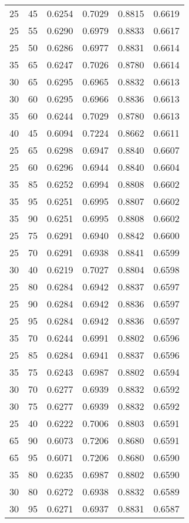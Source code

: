 \begin{center}
\begin{longtable}{|l|l|l|l|l|l|}
25 & 45 & 0.6254 & 0.7029 & 0.8815 & 0.6619 \\
25 & 55 & 0.6290 & 0.6979 & 0.8833 & 0.6617 \\
25 & 50 & 0.6286 & 0.6977 & 0.8831 & 0.6614 \\
35 & 65 & 0.6247 & 0.7026 & 0.8780 & 0.6614 \\
30 & 65 & 0.6295 & 0.6965 & 0.8832 & 0.6613 \\
30 & 60 & 0.6295 & 0.6966 & 0.8836 & 0.6613 \\
35 & 60 & 0.6244 & 0.7029 & 0.8780 & 0.6613 \\
40 & 45 & 0.6094 & 0.7224 & 0.8662 & 0.6611 \\
25 & 65 & 0.6298 & 0.6947 & 0.8840 & 0.6607 \\
25 & 60 & 0.6296 & 0.6944 & 0.8840 & 0.6604 \\
35 & 85 & 0.6252 & 0.6994 & 0.8808 & 0.6602 \\
35 & 95 & 0.6251 & 0.6995 & 0.8807 & 0.6602 \\
35 & 90 & 0.6251 & 0.6995 & 0.8808 & 0.6602 \\
25 & 75 & 0.6291 & 0.6940 & 0.8842 & 0.6600 \\
25 & 70 & 0.6291 & 0.6938 & 0.8841 & 0.6599 \\
30 & 40 & 0.6219 & 0.7027 & 0.8804 & 0.6598 \\
25 & 80 & 0.6284 & 0.6942 & 0.8837 & 0.6597 \\
25 & 90 & 0.6284 & 0.6942 & 0.8836 & 0.6597 \\
25 & 95 & 0.6284 & 0.6942 & 0.8836 & 0.6597 \\
35 & 70 & 0.6244 & 0.6991 & 0.8802 & 0.6596 \\
25 & 85 & 0.6284 & 0.6941 & 0.8837 & 0.6596 \\
35 & 75 & 0.6243 & 0.6987 & 0.8802 & 0.6594 \\
30 & 70 & 0.6277 & 0.6939 & 0.8832 & 0.6592 \\
30 & 75 & 0.6277 & 0.6939 & 0.8832 & 0.6592 \\
25 & 40 & 0.6222 & 0.7006 & 0.8803 & 0.6591 \\
65 & 90 & 0.6073 & 0.7206 & 0.8680 & 0.6591 \\
65 & 95 & 0.6071 & 0.7206 & 0.8680 & 0.6590 \\
35 & 80 & 0.6235 & 0.6987 & 0.8802 & 0.6590 \\
30 & 80 & 0.6272 & 0.6938 & 0.8832 & 0.6589 \\
30 & 95 & 0.6271 & 0.6937 & 0.8831 & 0.6587 \\

\end{longtable}
\end{center}

